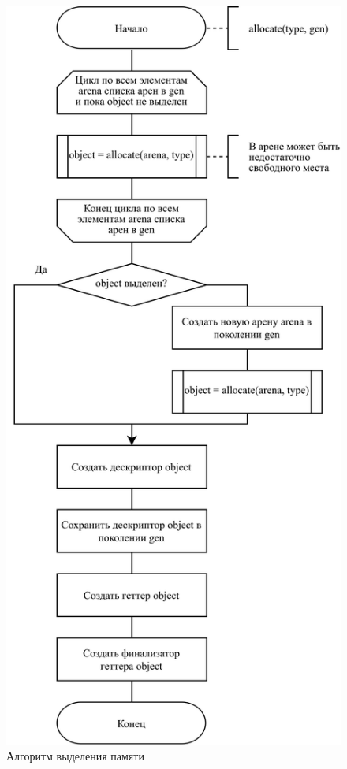 \begin{figure}[H]
	\centering
	\includegraphics[scale=0.185]{assets/allocate.png}
	\caption{Алгоритм выделения памяти}
	\label{fig:allocation}
\end{figure}

